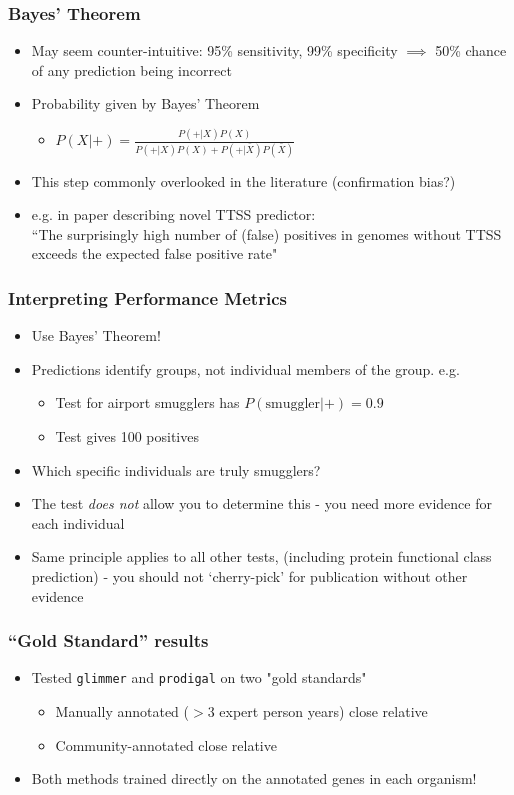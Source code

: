\begin{frame}
  \frametitle{Bayes' Theorem}
  \begin{itemize}
    \item May seem counter-intuitive: 95\% sensitivity, 99\% specificity $\implies$ 50\% chance of any prediction being incorrect
    \item Probability given by Bayes' Theorem
    \begin{itemize}
      \item $P(X|+) =  \frac{P(+|X) P(X)}{P(+|X) P(X) + P(+|\bar{X}) P(\bar{X})}$
    \end{itemize}
    \item This step commonly overlooked in the literature (confirmation bias?)
    \item e.g. in paper describing novel TTSS predictor: \\
      ``The surprisingly high number of (false) positives in genomes without TTSS exceeds the expected false positive rate"
  \end{itemize} 
\end{frame}

\begin{frame}
  \frametitle{Interpreting Performance Metrics}
  \begin{itemize}
    \item<1-> Use Bayes' Theorem!
    \item<1-> Predictions identify groups, not individual members of the group. e.g.
    \begin{itemize}
      \item Test for airport smugglers has $P(\text{smuggler}|+) = 0.9$
      \item Test gives 100 positives
    \end{itemize}
    \item<1-> Which specific individuals are truly smugglers?
    \item<2-> The test \emph{does not} allow you to determine this - you need more evidence for each individual
    \item<2->  Same principle applies to all other tests, (including protein functional class prediction) - you should not `cherry-pick' for publication without other evidence
  \end{itemize} 
\end{frame}

\begin{frame}
  \frametitle{``Gold Standard'' results}
  \begin{itemize}
    \item Tested \texttt{glimmer} and \texttt{prodigal} on two "gold standards"
    \begin{itemize}
      \item Manually annotated ($>$3 expert person years) close relative
      \item Community-annotated close relative
    \end{itemize}
    \item Both methods trained directly on the annotated genes in each organism!
  \end{itemize} 
\end{frame}

